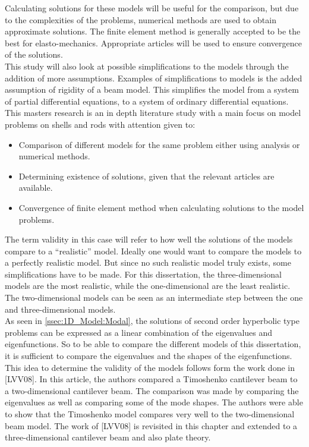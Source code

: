 \documentclass[../main.tex]{subfiles}
\begin{document}
Calculating solutions for these models will be useful for the comparison, but due to the complexities of the problems, numerical methods are used to obtain approximate solutions. The finite element method is generally accepted to be the best for elasto-mechanics. Appropriate articles will be used to ensure convergence of the solutions.\\

This study will also look at possible simplifications to the models through the addition of more assumptions. Examples of simplifications to models is the added assumption of rigidity of a beam model. This simplifies the model from a system of partial differential equations, to a system of ordinary differential equations.\\

This masters research is an in depth literature study with a main focus on model problems on shells and rods with attention given to:
\begin{itemize}
	\item Comparison of different models for the same problem either using analysis or numerical methods.
	\item Determining existence of solutions, given that the relevant articles are available.
	\item Convergence of finite element method when calculating solutions to the model problems.
\end{itemize}

The term validity in this case will refer to how well the solutions of the models compare to a ``realistic'' model. Ideally one would want to compare the models to a perfectly realistic model. But since no such realistic model truly exists, some simplifications have to be made. For this dissertation, the three-dimensional models are the most realistic, while the one-dimensional are the least realistic. The two-dimensional models can be seen as an intermediate step between the one and three-dimensional models.\\

As seen in \ref{ssec:1D_Model:Modal}, the solutions of second order hyperbolic type problems can be expressed as a linear combination of the eigenvalues and eigenfunctions. So to be able to compare the different models of this dissertation, it is sufficient to compare the eigenvalues and the shapes of the eigenfunctions.\\

This idea to determine the validity of the models follows form the work done in [LVV08]. In this article, the authors compared a Timoshenko cantilever beam to a two-dimensional cantilever beam. The comparison was made by comparing the eigenvalues as well as comparing some of the mode shapes. The authors were able to show that the Timoshenko model compares very well to the two-dimensional beam model. The work of [LVV08] is revisited in this chapter and extended to a three-dimensional cantilever beam and also plate theory.\\
\end{document}
